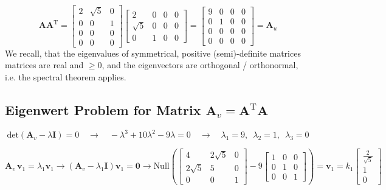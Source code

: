 \documentclass[a4paper, 11pt]{scrartcl}
\begin{document}
$$
\bm{A} \bm{A}^\mathrm{T}
=
\begin{bmatrix}
2 & \sqrt{5} & 0\\
0 & 0 & 1\\
0 & 0 & 0\\
0 & 0 & 0
\end{bmatrix}
\begin{bmatrix}
2 & 0 & 0 & 0\\
\sqrt{5} & 0 & 0  & 0\\
0 & 1 & 0 & 0
\end{bmatrix}
=
\begin{bmatrix}
9 & 0 & 0 & 0\\
0 & 1 & 0 & 0\\
0 & 0 & 0 & 0\\
0 & 0 & 0 & 0
\end{bmatrix}
=\bm{A}_u
$$
We recall, that the eigenvalues of symmetrical, positive (semi)-definite matrices matrices are real and $\geq 0$, and the
eigenvectors are orthogonal / orthonormal, i.e. the spectral theorem applies.

\subsection{Eigenwert Problem for Matrix $\bm{A}_v = \bm{A}^\mathrm{T} \bm{A}$}

$$
\mathrm{det}(\bm{A}_v - \lambda \bm{I}) = 0
\quad\rightarrow\quad
-\lambda^3 + 10 \lambda^2 - 9 \lambda = 0
\quad\rightarrow\quad
\lambda_1 = 9,\,\,\,
\lambda_2 = 1,\,\,\,
\lambda_3 = 0
$$

$$\bm{A}_v \, \bm{v}_1 = \lambda_1 \bm{v}_1
\rightarrow
(\bm{A}_v - \lambda_1 \bm{I}) \bm{v}_1 = \bm{0}
\rightarrow \text{Null}\left(
\begin{bmatrix}
4 & 2 \sqrt{5} & 0\\
2 \sqrt{5} & 5 & 0\\
0 & 0 & 1
\end{bmatrix}
- 9
\begin{bmatrix}
1 & 0 & 0\\
0 & 1 & 0\\
0 & 0 & 1
\end{bmatrix}
\right) = \bm{v}_1 =
k_1
\begin{bmatrix}
\frac{2}{\sqrt{5}}\\
1\\
0
\end{bmatrix}
$$
\end{document}
